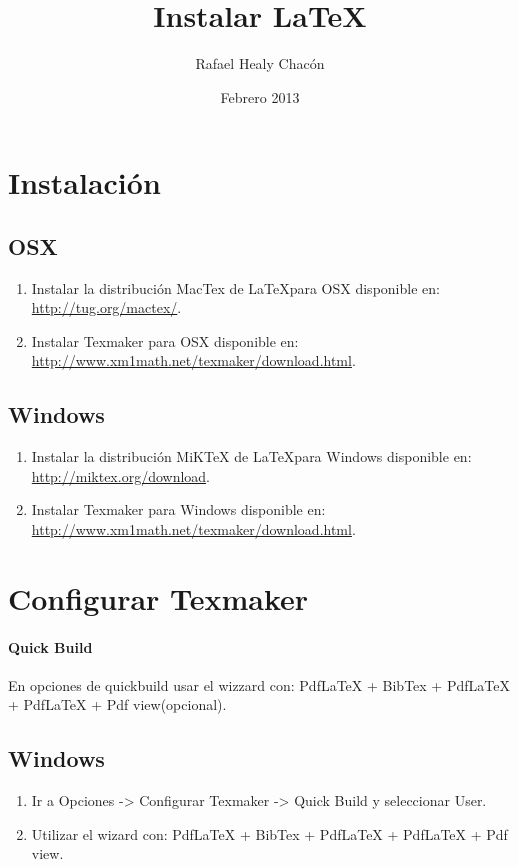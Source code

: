 \documentclass[12pt, a4paper]{article}
\title{Instalar \LaTeX}
\author{Rafael Healy Chacón}
\date{Febrero 2013}
\begin{document}
\maketitle

\section{Instalación}
\subsection{OSX}
\begin{enumerate}
\item Instalar la distribución MacTex de \LaTeX para OSX disponible en: \url{http://tug.org/mactex/}.
\item Instalar Texmaker para OSX disponible en: \url{http://www.xm1math.net/texmaker/download.html}.
\end{enumerate}

\subsection{Windows}
\begin{enumerate}
\item Instalar la distribución MiKTeX de \LaTeX para Windows disponible en: \url{http://miktex.org/download}.
\item Instalar Texmaker para Windows disponible en: \url{http://www.xm1math.net/texmaker/download.html}.
\end{enumerate}

\section{Configurar Texmaker}
\paragraph{Quick Build}
En opciones de quickbuild usar el wizzard con: PdfLaTeX + BibTex + PdfLaTeX + PdfLaTeX + Pdf view(opcional).

\subsection{Windows}
\begin{enumerate}
\item Ir a Opciones -> Configurar Texmaker -> Quick Build y seleccionar User.
\item Utilizar el wizard con: PdfLaTeX + BibTex + PdfLaTeX + PdfLaTeX + Pdf view.
\end{enumerate}
\end{document}
